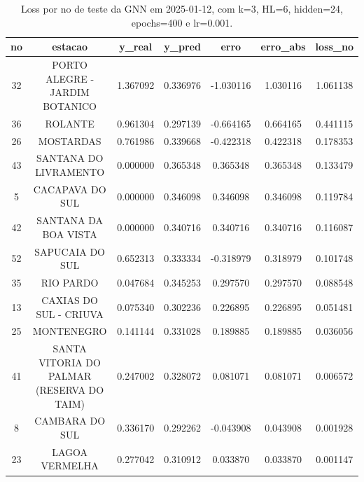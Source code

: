 \begin{table}[h]
\centering
\caption{Loss por no de teste da GNN em 2025-01-12, com k=3, HL=6, hidden=24, epochs=400 e lr=0.001.}
\label{tab:gnn_loss_k3_hl6_h24_e400_d20250112}
\begin{tabular}{ccccccc}
\toprule
no & estacao & y\_real & y\_pred & erro & erro\_abs & loss\_no \\
\midrule
32 & PORTO ALEGRE - JARDIM BOTANICO & 1.367092 & 0.336976 & -1.030116 & 1.030116 & 1.061138 \\
36 & ROLANTE & 0.961304 & 0.297139 & -0.664165 & 0.664165 & 0.441115 \\
26 & MOSTARDAS & 0.761986 & 0.339668 & -0.422318 & 0.422318 & 0.178353 \\
43 & SANTANA DO LIVRAMENTO & 0.000000 & 0.365348 & 0.365348 & 0.365348 & 0.133479 \\
5 & CACAPAVA DO SUL & 0.000000 & 0.346098 & 0.346098 & 0.346098 & 0.119784 \\
42 & SANTANA DA BOA VISTA & 0.000000 & 0.340716 & 0.340716 & 0.340716 & 0.116087 \\
52 & SAPUCAIA DO SUL & 0.652313 & 0.333334 & -0.318979 & 0.318979 & 0.101748 \\
35 & RIO PARDO & 0.047684 & 0.345253 & 0.297570 & 0.297570 & 0.088548 \\
13 & CAXIAS DO SUL - CRIUVA & 0.075340 & 0.302236 & 0.226895 & 0.226895 & 0.051481 \\
25 & MONTENEGRO & 0.141144 & 0.331028 & 0.189885 & 0.189885 & 0.036056 \\
41 & SANTA VITORIA DO PALMAR (RESERVA DO TAIM) & 0.247002 & 0.328072 & 0.081071 & 0.081071 & 0.006572 \\
8 & CAMBARA DO SUL & 0.336170 & 0.292262 & -0.043908 & 0.043908 & 0.001928 \\
23 & LAGOA VERMELHA & 0.277042 & 0.310912 & 0.033870 & 0.033870 & 0.001147 \\
\bottomrule
\end{tabular}
\end{table}
